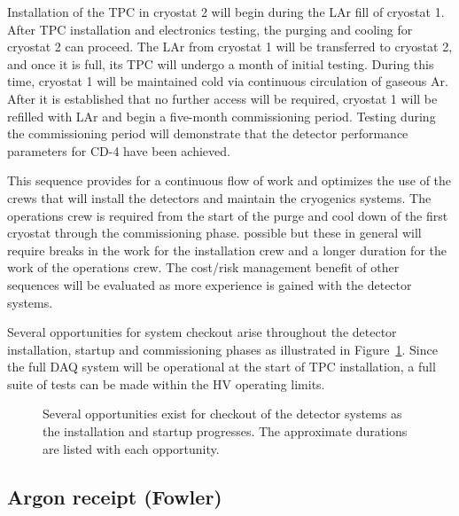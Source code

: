Installation of the TPC in cryostat 2 will begin during the LAr fill of cryostat 1. After TPC installation and electronics testing, the purging and cooling for cryostat 2 can proceed. The LAr from cryostat 1 will be 
transferred to cryostat 2, and once it is full, its TPC will undergo a month of initial testing. During this time, cryostat 1 will be maintained cold via continuous circulation of gaseous Ar. After it is established that no further access will be required, cryostat 1 will be refilled with LAr and begin a five-month commissioning period. Testing during the commissioning period will demonstrate that the detector performance parameters for CD-4 have been achieved. 

This sequence provides for a continuous flow of work and optimizes the use of the crews that will install the detectors and maintain the cryogenics systems. The operations crew is required from the start of the purge and 
cool down of the first cryostat through the commissioning phase. possible but these in general will require breaks in the work for the installation crew and a longer duration for the work of the operations crew. The cost/risk 
management benefit of other sequences will be evaluated as more experience is gained with the detector systems. 

Several opportunities for system checkout arise throughout the detector installation, startup and commissioning phases as illustrated in Figure~\ref{fig:tpc-install-checkout-duration}. Since the full DAQ system will be operational at the start of TPC installation, a 
full suite of tests can be made within the HV operating limits. 

\begin{figure}[htbp]
\centering
\caption[Checkout of the detector systems, durations]{Several opportunities exist for checkout of the detector systems as the installation and startup progresses. The approximate durations are listed with each opportunity.} 
\label{fig:tpc-install-checkout-duration}
\end{figure}

\subsection{Argon receipt (Fowler)}
\label{fd:install:Argon receipt (Fowler)}

